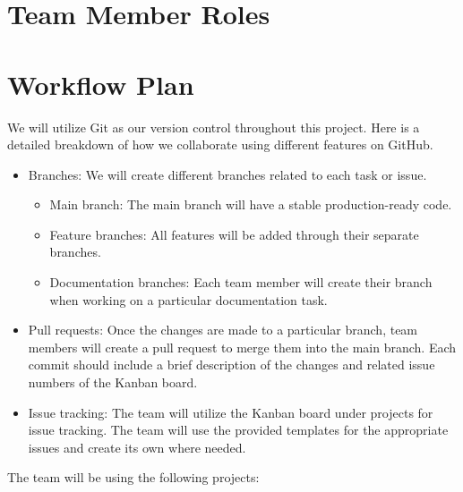 \documentclass{article}
\begin{document}

\section{Team Member Roles}


\section{Workflow Plan}

We will utilize Git as our version control throughout this project. Here is a detailed breakdown of how we collaborate using different features on GitHub. 

\begin{itemize}
\item Branches: We will create different branches related to each task or issue. 
\begin{itemize}
\item Main branch: The main branch will have a stable production-ready code. 
\item Feature branches: All features will be added through their separate branches.
\item Documentation branches: Each team member will create their branch when working on a particular documentation task. 
\end{itemize}

\item Pull requests: Once the changes are made to a particular branch, team members will create a pull request to merge them into the main branch. Each commit should include a brief description of the changes and related issue numbers of the Kanban board.

\item Issue tracking: The team will utilize the Kanban board under projects for issue tracking. The team will use the provided templates for the appropriate issues and create its own where needed. 
\end{itemize}

The team will be using the following projects:
\end{document}
